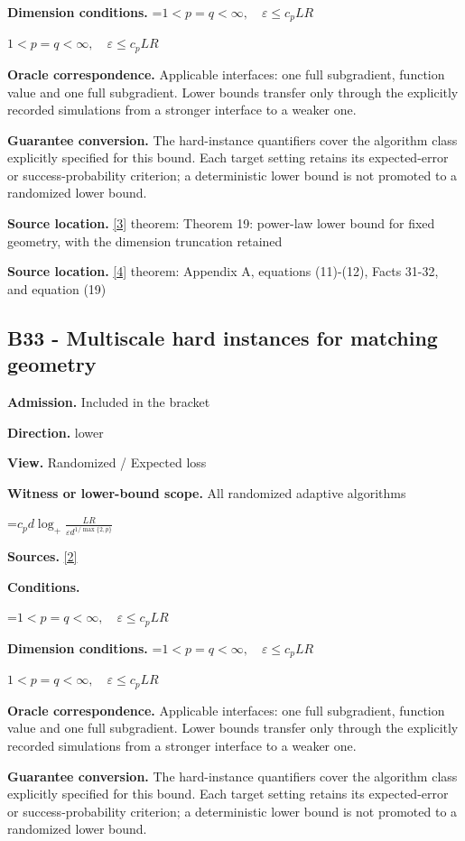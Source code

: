 \documentclass[10pt,a4paper]{article}
\newcommand{\AtlasMath}[1]{\par\begingroup\centering\setbox0=\hbox{$\displaystyle #1$}\ifdim\wd0>1.4\linewidth\typeout{ATLAS WIDE FORMULA: \the\wd0}\fi\ifdim\wd0>\linewidth\resizebox{\linewidth}{!}{\box0}\else\box0\fi\par\endgroup}
\newcommand{\AtlasInlineMath}[1]{\begingroup\setbox0=\hbox{$#1$}\ifdim\wd0>.4\linewidth\endgroup\AtlasMath{#1}\else\endgroup$#1$\fi}
\begin{document}
\textbf{Dimension conditions.} \AtlasInlineMath{1<p=q<\infty,\quad\varepsilon\le c_p LR}

\textbf{Oracle correspondence.} Applicable interfaces: one full subgradient, function value and one full subgradient. Lower bounds transfer only through the explicitly recorded simulations from a stronger interface to a weaker one.

\textbf{Guarantee conversion.} The hard-instance quantifiers cover the algorithm class explicitly specified for this bound. Each target setting retains its expected-error or success-probability criterion; a deterministic lower bound is not promoted to a randomized lower bound.

\textbf{Source location.} \href{https://arxiv.org/pdf/2609.20701}{[3]} theorem: Theorem 19: power-law lower bound for fixed geometry, with the dimension truncation retained

\textbf{Source location.} \href{https://arxiv.org/pdf/2609.20687}{[4]} theorem: Appendix A, equations (11)-(12), Facts 31-32, and equation (19)

\subsection{B33 - Multiscale hard instances for matching geometry}
\textbf{Admission.} Included in the bracket

\textbf{Direction.} lower

\textbf{View.} Randomized / Expected loss

\textbf{Witness or lower-bound scope.} All randomized adaptive algorithms

\AtlasMath{c_p d\log_+\frac{LR}{\varepsilon d^{1/\max\{2,p\}}}}
\textbf{Sources.} \href{https://arxiv.org/pdf/1407.5144}{[2]}

\textbf{Conditions.} 
\AtlasMath{1<p=q<\infty,\quad\varepsilon\le c_p LR}


\textbf{Dimension conditions.} \AtlasInlineMath{1<p=q<\infty,\quad\varepsilon\le c_p LR}

\textbf{Oracle correspondence.} Applicable interfaces: one full subgradient, function value and one full subgradient. Lower bounds transfer only through the explicitly recorded simulations from a stronger interface to a weaker one.

\textbf{Guarantee conversion.} The hard-instance quantifiers cover the algorithm class explicitly specified for this bound. Each target setting retains its expected-error or success-probability criterion; a deterministic lower bound is not promoted to a randomized lower bound.
\end{document}
